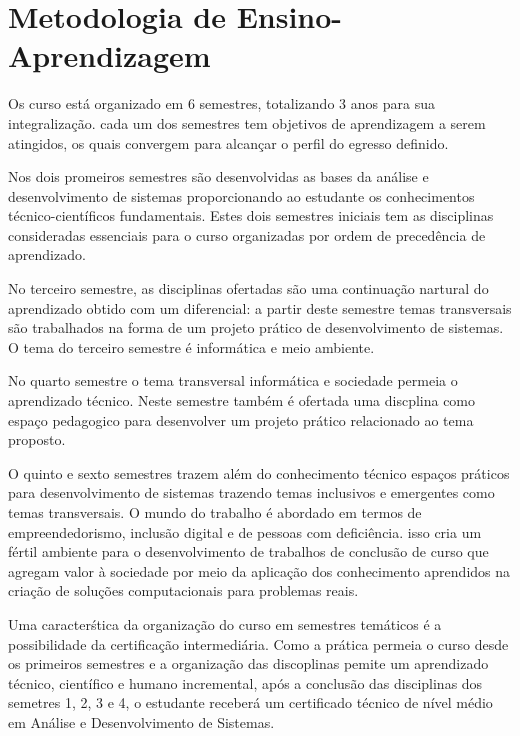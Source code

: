 \documentclass[11pt,fleqn]{book} %
\begin{document}
\section{Metodologia de Ensino-Aprendizagem}\label{metodologia}

Os curso está organizado em 6 semestres, totalizando 3 anos para sua integralização.
cada um dos semestres tem objetivos de aprendizagem a serem atingidos, os quais convergem para alcançar o perfil do egresso definido.

Nos dois promeiros semestres são desenvolvidas as bases da análise e desenvolvimento de sistemas proporcionando ao estudante os conhecimentos técnico-científicos fundamentais.
Estes dois semestres iniciais tem as disciplinas consideradas essenciais para o curso organizadas por ordem de precedência de aprendizado.

No terceiro semestre, as disciplinas ofertadas são uma continuação nartural do aprendizado obtido com um diferencial: a partir deste semestre temas transversais são trabalhados na forma de um projeto prático de desenvolvimento de sistemas.
O tema do terceiro semestre é informática e meio ambiente.

No quarto semestre o tema transversal informática e sociedade permeia o aprendizado técnico.
Neste semestre também é ofertada uma discplina como espaço pedagogico para desenvolver um projeto prático relacionado ao tema proposto.

O quinto e sexto semestres trazem além do conhecimento técnico espaços práticos para desenvolvimento de sistemas trazendo temas inclusivos e emergentes como temas transversais.
O mundo do trabalho é abordado em termos de empreendedorismo, inclusão digital e de pessoas com deficiência.
isso cria um fértil ambiente para o desenvolvimento de trabalhos de conclusão de curso que agregam valor à sociedade por meio da aplicação dos conhecimento aprendidos na criação de soluções computacionais para problemas reais.

Uma caracterśtica da organização do curso em semestres temáticos é a possibilidade da certificação intermediária.
Como a prática permeia o curso desde os primeiros semestres e a organização das discoplinas pemite um aprendizado técnico, científico e humano incremental, após a conclusão das disciplinas dos semetres 1, 2, 3 e 4, o estudante receberá um certificado técnico de nível médio em Análise e Desenvolvimento de Sistemas.
\end{document}

